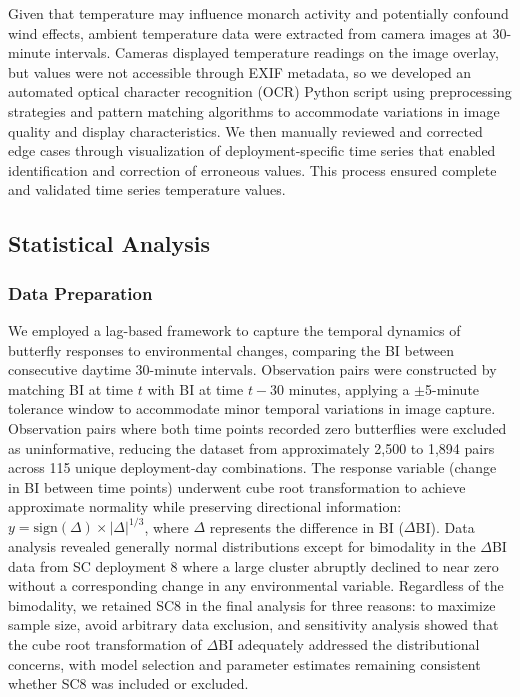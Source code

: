 \documentclass[insects,article,submit,pdftex,moreauthors]{Definitions/mdpi}
\begin{document}
Given that temperature may influence monarch activity and potentially confound wind effects, ambient temperature data were extracted from camera images at 30-minute intervals. Cameras displayed temperature readings on the image overlay, but values were not accessible through EXIF metadata, so we developed an automated optical character recognition (OCR) Python script using preprocessing strategies and pattern matching algorithms to accommodate variations in image quality and display characteristics. We then manually reviewed and corrected edge cases through visualization of deployment-specific time series that enabled identification and correction of erroneous values. This process ensured complete and validated time series temperature values.

\subsection{Statistical Analysis}

\subsubsection{Data Preparation}

We employed a lag-based framework to capture the temporal dynamics of butterfly responses to environmental changes, comparing the BI between consecutive daytime 30-minute intervals. Observation pairs were constructed by matching BI at time $t$ with BI at time $t - 30$ minutes, applying a $\pm$5-minute tolerance window to accommodate minor temporal variations in image capture. Observation pairs where both time points recorded zero butterflies were excluded as uninformative, reducing the dataset from approximately 2,500 to 1,894 pairs across 115 unique deployment-day combinations. The response variable (change in BI between time points) underwent cube root transformation to achieve approximate normality while preserving directional information: $y = \text{sign}(\Delta) \times |\Delta|^{1/3}$, where $\Delta$ represents the difference in BI ($\Delta$BI). Data analysis revealed generally normal distributions except for bimodality in the $\Delta$BI data from SC deployment 8 where a large cluster abruptly declined to near zero without a corresponding change in any environmental variable. Regardless of the bimodality, we retained SC8 in the final analysis for three reasons: to maximize sample size, avoid arbitrary data exclusion, and sensitivity analysis showed that the cube root transformation of $\Delta$BI adequately addressed the distributional concerns, with model selection and parameter estimates remaining consistent whether SC8 was included or excluded.
\end{document}
